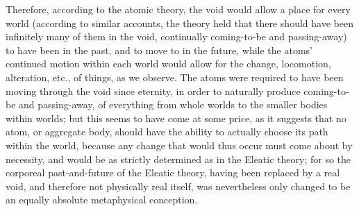 Therefore, according to the atomic theory, the void would allow a place for every world (according to similar accounts, the theory held that there should have been infinitely many of them in the void, continually coming-to-be and passing-away) to have been in the past, and to move to in the future, while the atoms' continued motion within each world would allow for the change, locomotion, alteration, etc., of things, as we observe. The atoms were required to have been moving through the void since eternity, in order to naturally produce coming-to-be and passing-away, of everything from whole worlds to the smaller bodies within worlds; but this seems to have come at some price, as it suggests that no atom, or aggregate body, should have the ability to actually choose its path within the world, because any change that would thus occur must come about by necessity, and would be as strictly determined as in the Eleatic theory; for so the corporeal past-and-future of the Eleatic theory, having been replaced by a real void, and therefore not physically real itself, was nevertheless only changed to be an equally absolute metaphysical conception. 

